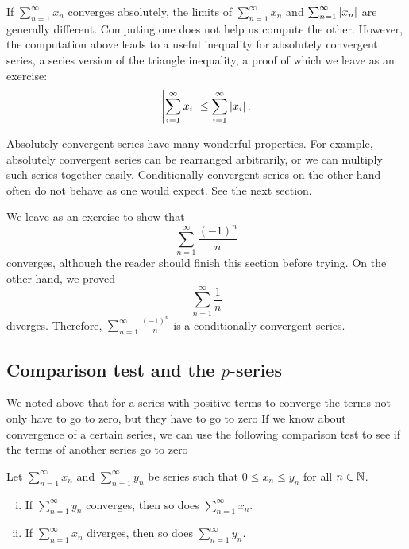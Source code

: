 If $\sum_{n=1}^\infty x_n$ converges absolutely, the limits of
$\sum_{n=1}^\infty x_n$ and $\sum_{n=1}^\infty \left\lvert {x_n} \right\rvert$ are generally different.  Computing one
does not help us compute the other.  However, the computation above leads to
a useful inequality for absolutely convergent series,
a series version of the triangle inequality,
a proof of which we leave as an exercise:
\begin{equation*}
\left\lvert { \sum_{i=1}^\infty x_i } \right\rvert
\leq
\sum_{i=1}^\infty \left\lvert {x_i} \right\rvert .
\end{equation*}

Absolutely convergent series have many wonderful properties.
For example, absolutely convergent
series can be rearranged arbitrarily, or we can multiply such
series together easily.  Conditionally convergent series on the other hand
often do not behave as one would expect.  See the next section.

We leave as an exercise to show that
\begin{equation*}
\sum_{n=1}^\infty \frac{{(-1)}^n}{n}
\end{equation*}
converges, although the reader should finish this section before trying.
On the other hand, we proved
\begin{equation*}
\sum_{n=1}^\infty \frac{1}{n}
\end{equation*}
diverges.  Therefore,
$\sum_{n=1}^\infty \frac{{(-1)}^n}{n}$ is a conditionally convergent series.

\subsection{Comparison test and the \texorpdfstring{$p$}{p}-series}

We noted above that for a series with positive terms to converge
the terms not only have to go to zero, but they have to go to zero
  If we know about convergence of a certain series,
we can use the following comparison test to see if the terms of another
series go to zero 

\begin{samepage}
\begin{prop}
Let $\sum_{n=1}^\infty x_n$ and $\sum_{n=1}^\infty y_n$ be series such that $0 \leq x_n \leq y_n$
for all $n \in {\mathbb{N}}$.
\begin{enumerate}[(i)]
\item If $\sum_{n=1}^\infty y_n$ converges, then so does $\sum_{n=1}^\infty x_n$.
\item If $\sum_{n=1}^\infty x_n$ diverges, then so does $\sum_{n=1}^\infty y_n$.
\end{enumerate}
\end{prop}
\end{samepage}

